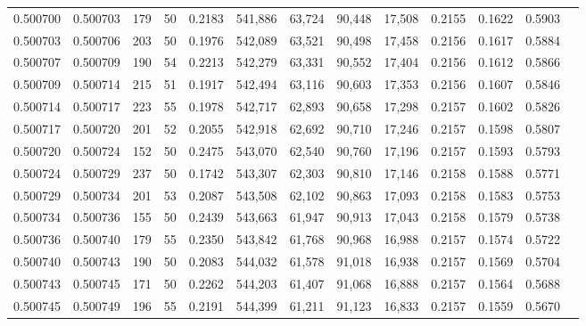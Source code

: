 \begin{tabular}{rrrrrrrrrrrrr}
0.500700 & 0.500703 & 179 &  50 &                                     0.2183 & 541,886 &  63,724 &  90,448 &  17,508 & 0.2155 & 0.1622 & 0.5903 \\
0.500703 & 0.500706 & 203 &  50 &                                     0.1976 & 542,089 &  63,521 &  90,498 &  17,458 & 0.2156 & 0.1617 & 0.5884 \\
0.500707 & 0.500709 & 190 &  54 &                                     0.2213 & 542,279 &  63,331 &  90,552 &  17,404 & 0.2156 & 0.1612 & 0.5866 \\
0.500709 & 0.500714 & 215 &  51 &                                     0.1917 & 542,494 &  63,116 &  90,603 &  17,353 & 0.2156 & 0.1607 & 0.5846 \\
0.500714 & 0.500717 & 223 &  55 &                                     0.1978 & 542,717 &  62,893 &  90,658 &  17,298 & 0.2157 & 0.1602 & 0.5826 \\
0.500717 & 0.500720 & 201 &  52 &                                     0.2055 & 542,918 &  62,692 &  90,710 &  17,246 & 0.2157 & 0.1598 & 0.5807 \\
0.500720 & 0.500724 & 152 &  50 &                                     0.2475 & 543,070 &  62,540 &  90,760 &  17,196 & 0.2157 & 0.1593 & 0.5793 \\
0.500724 & 0.500729 & 237 &  50 &                                     0.1742 & 543,307 &  62,303 &  90,810 &  17,146 & 0.2158 & 0.1588 & 0.5771 \\
0.500729 & 0.500734 & 201 &  53 &                                     0.2087 & 543,508 &  62,102 &  90,863 &  17,093 & 0.2158 & 0.1583 & 0.5753 \\
0.500734 & 0.500736 & 155 &  50 &                                     0.2439 & 543,663 &  61,947 &  90,913 &  17,043 & 0.2158 & 0.1579 & 0.5738 \\
0.500736 & 0.500740 & 179 &  55 &                                     0.2350 & 543,842 &  61,768 &  90,968 &  16,988 & 0.2157 & 0.1574 & 0.5722 \\
0.500740 & 0.500743 & 190 &  50 &                                     0.2083 & 544,032 &  61,578 &  91,018 &  16,938 & 0.2157 & 0.1569 & 0.5704 \\
0.500743 & 0.500745 & 171 &  50 &                                     0.2262 & 544,203 &  61,407 &  91,068 &  16,888 & 0.2157 & 0.1564 & 0.5688 \\
0.500745 & 0.500749 & 196 &  55 &                                     0.2191 & 544,399 &  61,211 &  91,123 &  16,833 & 0.2157 & 0.1559 & 0.5670 \\

\end{tabular}
